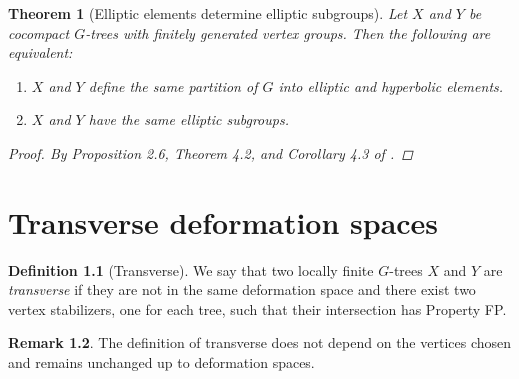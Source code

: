 \documentclass[12pt,parskip=full]{report}
\theoremstyle{plain}
\newtheorem{thm}{Theorem}[section]
\theoremstyle{definition}
\newtheorem{rmk}[thm]{Remark}
\newtheorem{dfn}[thm]{Definition}
\begin{document}
\begin{thm}
    [Elliptic elements determine elliptic subgroups]
    \label{thm:ellelesubgroups} 
    Let \(X\) and \(Y\) be cocompact \(G\)-trees with finitely generated vertex groups. Then the following are equivalent:
    \begin{enumerate}
        \item \(X\) and \(Y\) define the same partition of \(G\) into elliptic and hyperbolic elements.
        \item \(X\) and \(Y\) have the same elliptic subgroups.
    \end{enumerate}

    \begin{proof}
    By Proposition 2.6, Theorem 4.2, and Corollary 4.3 of \cite{foresterdeformationrigidity}.
    \end{proof}
\end{thm}
\chapter{Transverse deformation spaces}

\begin{dfn}
    [Transverse]
    \label{defn:transverse} 
    We say that two locally finite \(G\)-trees \(X\) and \(Y\) are \emph{transverse} if they are not in the same deformation space and there exist two vertex stabilizers, one for each tree, such that their intersection has Property FP.
\end{dfn}

\begin{rmk}
    The definition of transverse does not depend on the vertices chosen and remains unchanged up to deformation spaces. 
\end{rmk}
\end{document}

